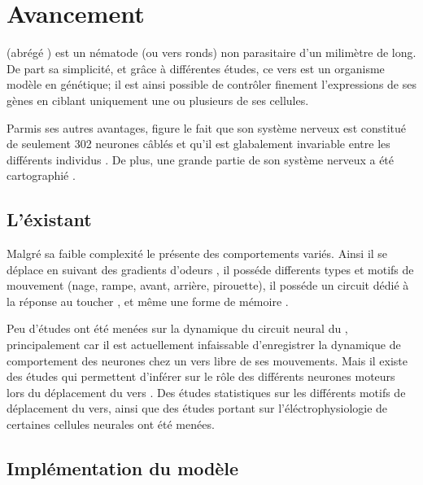 \chapter{Avancement} %
\label{cha:Avancement}

\caeleg{} (abrégé \celeg{}) est un nématode (ou vers ronds) non parasitaire d'un milimètre de long.
De part sa simplicité, et grâce à différentes études, ce vers est un organisme modèle en génétique;
il est ainsi possible de contrôler finement l'expressions de ses gènes en ciblant uniquement une ou
plusieurs de ses cellules.

Parmis ses autres avantages, figure le fait que son système nerveux est constitué de seulement 302
neurones câblés et qu'il est glabalement invariable entre les différents individus \cite{Boyle2009}.
De plus, une grande partie de son système nerveux a été cartographié
\cite{Durbin1987,Gray2005,Boyle2009,Varshney2011}.

\section{L'éxistant} %
\label{sec:L'éxistant}

Malgré sa faible complexité le \celeg{} présente des comportements variés. Ainsi il se déplace
en suivant des gradients d'odeurs \cite{Ferree1999,Gray2005}, il posséde differents types et
motifs de mouvement (nage, rampe, avant, arrière, pirouette), il posséde un circuit dédié à la 
réponse au toucher \cite{Chalfie1985}, et même une forme de mémoire \cite{Rankin2005a}.

Peu d'études ont été menées sur la dynamique du circuit neural du \celeg{}, principalement
car il est actuellement infaissable d'enregistrer la dynamique de comportement des neurones
chez un vers libre de ses mouvements.
Mais il existe des études qui permettent d'inférer sur le rôle des différents neurones moteurs
lors du déplacement du vers \cite{Yanik2006,Chronis2007,Leifer2011}.
Des études statistiques sur les différents motifs de déplacement \cite{Gray2005} du vers, ainsi que
des études portant sur l'éléctrophysiologie de certaines cellules neurales \cite{Mellem2008a,Lockery2009} ont été menées.


\section{Implémentation du modèle} %
\label{sub:Implémentation du modèle}

